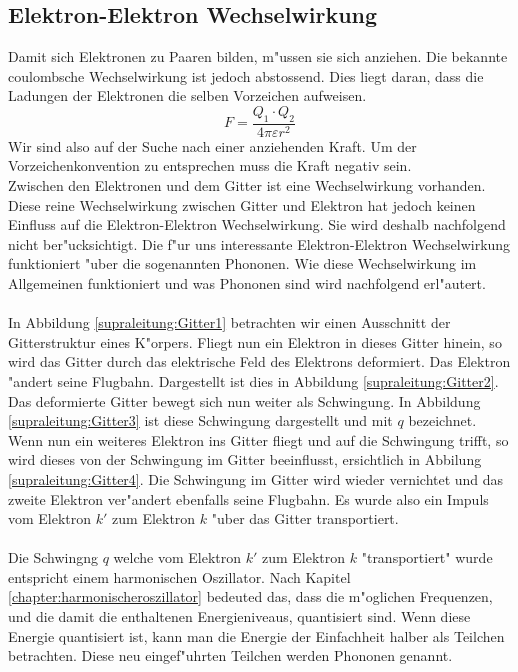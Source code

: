 \begin{refsection}
\section{Elektron-Elektron Wechselwirkung\label{supraleitung:elektronelektronwecheslwirkung}}
Damit sich Elektronen zu Paaren bilden, m"ussen sie sich anziehen. Die bekannte coulombsche Wechselwirkung ist jedoch abstossend. Dies liegt daran, dass die Ladungen der Elektronen die selben Vorzeichen aufweisen.
\begin{equation}
F = \frac{Q_1\cdot Q_2}{4\pi \varepsilon r^2}
\label{supraleitung:Coulomb}
\end{equation}
Wir sind also auf der Suche nach einer anziehenden Kraft. Um der Vorzeichenkonvention zu entsprechen muss die Kraft negativ sein.
\\
Zwischen den Elektronen und dem Gitter ist eine Wechselwirkung vorhanden. Diese reine Wechselwirkung zwischen Gitter und Elektron hat jedoch keinen Einfluss auf die Elektron-Elektron Wechselwirkung. Sie wird deshalb nachfolgend nicht ber"ucksichtigt.
Die f"ur uns interessante Elektron-Elektron Wechselwirkung funktioniert "uber die sogenannten Phononen. Wie diese Wechselwirkung im Allgemeinen funktioniert und was Phononen sind wird nachfolgend erl"autert.
\\
\\
In Abbildung \ref{supraleitung:Gitter1} betrachten wir einen Ausschnitt der Gitterstruktur eines K"orpers. Fliegt nun ein Elektron in dieses Gitter hinein, so wird das Gitter durch das elektrische Feld des Elektrons deformiert. Das Elektron "andert seine Flugbahn. Dargestellt ist dies in Abbildung \ref{supraleitung:Gitter2}. Das deformierte Gitter bewegt sich nun weiter als Schwingung. In Abbildung \ref{supraleitung:Gitter3} ist diese Schwingung dargestellt und mit $q$ bezeichnet. Wenn nun ein weiteres Elektron ins Gitter fliegt und auf die Schwingung trifft, so wird dieses von der Schwingung im Gitter beeinflusst, ersichtlich in Abbilung \ref{supraleitung:Gitter4}. Die Schwingung im Gitter wird wieder vernichtet und das zweite Elektron ver"andert ebenfalls seine Flugbahn. Es wurde also ein Impuls vom Elektron $k'$ zum Elektron $k$ "uber das Gitter transportiert. 
\\
\\
Die Schwingng $q$ welche vom Elektron $k'$ zum Elektron $k$ "transportiert" wurde entspricht einem harmonischen Oszillator. Nach Kapitel \ref{chapter:harmonischeroszillator} bedeuted das, dass die m"oglichen Frequenzen, und die damit die enthaltenen Energieniveaus, quantisiert sind. Wenn diese Energie quantisiert ist, kann man die Energie der Einfachheit halber als Teilchen betrachten. Diese neu eingef"uhrten Teilchen werden Phononen genannt.\\

\end{refsection}
